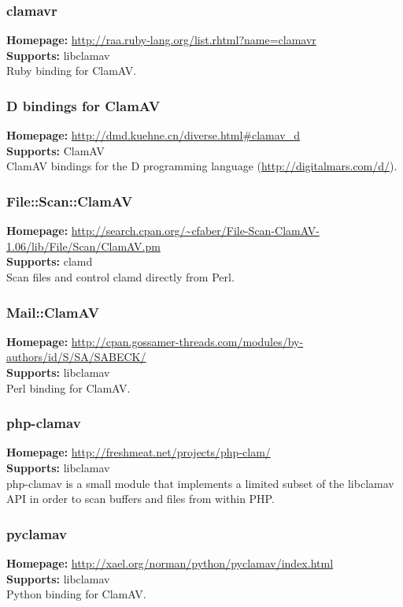 \documentclass[a4paper,titlepage,12pt]{article}
\begin{document}
    \subsubsection{clamavr}
    \textbf{Homepage:} \url{http://raa.ruby-lang.org/list.rhtml?name=clamavr}\\
    \textbf{Supports:} libclamav\\[4pt]
    Ruby binding for ClamAV.

    \subsubsection{D bindings for ClamAV}
    \textbf{Homepage:} \url{http://dmd.kuehne.cn/diverse.html#clamav_d}\\
    \textbf{Supports:} ClamAV\\[4pt]
    ClamAV bindings for the D programming language
    (\url{http://digitalmars.com/d/}).

    \subsubsection{File::Scan::ClamAV}
    \textbf{Homepage:} \url{http://search.cpan.org/~cfaber/File-Scan-ClamAV-1.06/lib/File/Scan/ClamAV.pm}\\
    \textbf{Supports:} clamd\\[4pt]
     Scan files and control clamd directly from Perl.

    \subsubsection{Mail::ClamAV}
    \textbf{Homepage:} \url{http://cpan.gossamer-threads.com/modules/by-authors/id/S/SA/SABECK/}\\
    \textbf{Supports:} libclamav\\[4pt]
    Perl binding for ClamAV.

    \subsubsection{php-clamav}
    \textbf{Homepage:} \url{http://freshmeat.net/projects/php-clam/}\\
    \textbf{Supports:} libclamav\\[4pt]
    php-clamav is a small module that implements a limited subset of the
    libclamav API in order to scan buffers and files from within PHP.

    \subsubsection{pyclamav}
    \textbf{Homepage:} \url{http://xael.org/norman/python/pyclamav/index.html}\\
    \textbf{Supports:} libclamav\\[4pt]
    Python binding for ClamAV.
\end{document}
